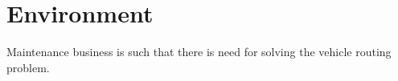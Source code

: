 \chapter{Environment}
\label{chapter:environment}

Maintenance business is such that there is need for solving the vehicle routing
problem.
